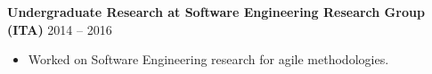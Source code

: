 \documentclass[11pt,letter,sans,colorlinks,linkcolor=true]{moderncv}
\begin{document}
  \vspace{3mm}
    \textbf{Undergraduate Research at Software Engineering Research Group (ITA)}
    \hfill 2014 -- 2016 \par
    \begin{itemize}
\item[\textbullet]{Worked on Software Engineering research for agile methodologies.}
    \end{itemize}
  \vspace{3mm}
\vspace{-3mm}
\end{document}

